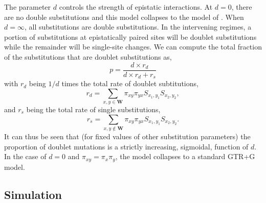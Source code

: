 \documentclass[11pt]{article}
\begin{document}
The parameter $d$ controls the strength of epistatic interactions.
At $d = 0$, there are no double substitutions and this model collapses to the model of \cite{schoniger1994stochastic}.
When $d = \infty$, all substitutions are double substitutions.
In the intervening regimes, a portion of substitutions at epistatically paired sites will be doublet substitutions while the remainder will be single-site changes.
We can compute the total fraction of the substitutions that are doublet substitutions as,
\[
p = \frac{ d \times r_{d} }{d \times r_{d} + r_{s}}
\]
with $r_d$ being $1 / d$ times the total rate of doublet subtitutions,
\[
  r_{d} = \sum_{x,y \in \boldsymbol{W}} \pi_{xy} \pi_{yx} S_{x_1,y_1} S_{x_2,y_2},
\]
and $r_s$ being the total rate of single substitutions,
\[
  r_{s} = \sum_{x,y \not\in \boldsymbol{W}} \pi_{xy} \pi_{yx} S_{x_1,y_1} S_{x_2,y_2}.
\]
It can thus be seen that (for fixed values of other substitution parameters) the proportion of doublet mutations is a strictly increasing, sigmoidal, function of $d$.
In the case of $d = 0$ and $\pi_{xy} = \pi_x \pi_y$, the model collapses to a standard GTR+G model.

\subsection*{Simulation\label{sec:simulation}}
\end{document}
